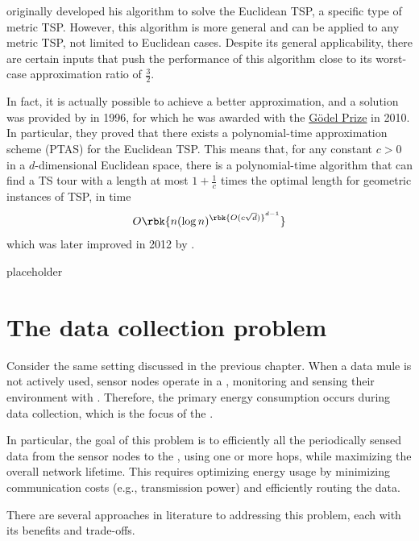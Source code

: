 \documentclass[a4paper, 12pt]{report}
\begin{document}
    \textcite{christofides} originally developed his algorithm to solve the Euclidean TSP, a specific type of metric TSP. However, this algorithm is more general and can be applied to any metric TSP, not limited to Euclidean cases. Despite its general applicability, there are certain inputs that push the performance of this algorithm close to its worst-case approximation ratio of $\frac{3}{2}$.

    In fact, it is actually possible to achieve a better approximation, and a solution was provided by \textcite{arora} in 1996, for which he was awarded with the \href{https://en.wikipedia.org/wiki/G%C3%B6del_Prize}{Gödel Prize} in 2010. In particular, they proved that there exists a polynomial-time approximation scheme (PTAS) for the Euclidean TSP. This means that, for any constant $c > 0$ in a $d$-dimensional Euclidean space, there is a polynomial-time algorithm that can find a TS tour with a length at most $1 + \frac{1}{c}$ times the optimal length for geometric instances of TSP, in time $$O\rbk{n (\log n)^{{\rbk{O(c \sqrt d)}}^{d - 1}}}$$ which was later improved in 2012 by \textcite{bartal}.

    placeholder 

    \chapter{The data collection problem}

    Consider the same setting discussed in the previous chapter. When a data mule is not actively used, sensor nodes operate in a , monitoring and sensing their environment with . Therefore, the primary energy consumption occurs during data collection, which is the focus of the .

    In particular, the goal of this problem is to efficiently  all the periodically sensed data from the sensor nodes to the , using one or more hops, while maximizing the overall network lifetime. This requires optimizing energy usage by minimizing communication costs (e.g., transmission power) and efficiently routing the data.

    There are several approaches in literature to addressing this problem, each with its benefits and trade-offs.
\end{document}
